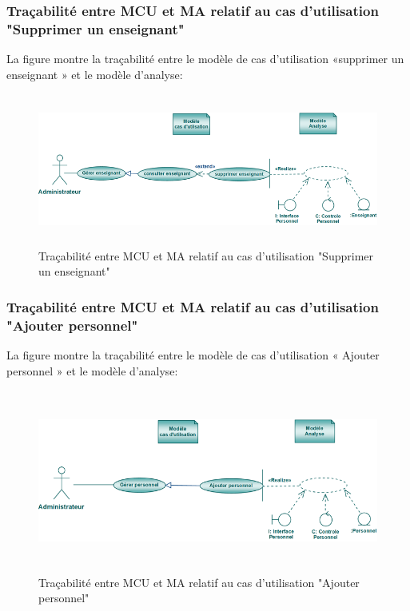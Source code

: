 \documentclass[12 pt]{report}
\begin{document}
\subsubsection{Traçabilité entre MCU et MA relatif au cas d’utilisation "Supprimer un enseignant" }
La figure  montre la traçabilité entre le modèle de cas d’utilisation «supprimer un enseignant » et le modèle
d’analyse:
\begin{figure}[h]
\begin{center}
\includegraphics[width= 13cm , height =5cm]{sup_ens.png}
\caption{Traçabilité entre MCU et MA relatif au cas d’utilisation "Supprimer un enseignant"}
\end{center}
\end{figure} 

\subsubsection{Traçabilité entre MCU et MA relatif au cas d’utilisation "Ajouter personnel" }
La figure  montre la traçabilité entre le modèle de cas d’utilisation « Ajouter personnel » et le modèle
d’analyse:
\begin{figure}[h]
\begin{center}
\includegraphics[width= 14cm , height =6cm]{tap.png}
\caption{Traçabilité entre MCU et MA relatif au cas d’utilisation "Ajouter personnel"}
\end{center}
\end{figure}
\end{document}
